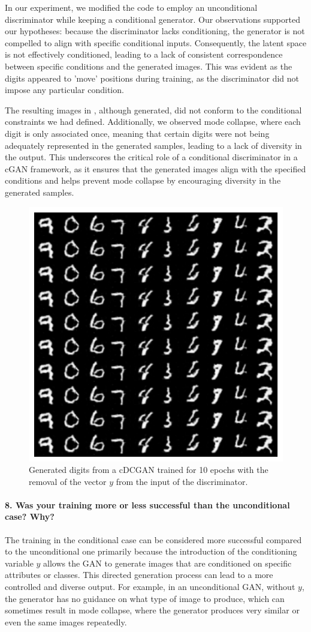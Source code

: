 In our experiment, we modified the code to employ an unconditional discriminator while keeping a conditional generator. Our observations supported our hypotheses: because the discriminator lacks conditioning, the generator is not compelled to align with specific conditional inputs. Consequently, the latent space is not effectively conditioned, leading to a lack of consistent correspondence between specific conditions and the generated images. This was evident as the digits appeared to 'move' positions during training, as the discriminator did not impose any particular condition.

The resulting images in , although generated, did not conform to the conditional constraints we had defined.  Additionally, we observed mode collapse, where each digit is only associated once, meaning that certain digits were not being adequately represented in the generated samples, leading to a lack of diversity in the output. This underscores the critical role of a conditional discriminator in a cGAN framework, as it ensures that the generated images align with the specified conditions and helps prevent mode collapse by encouraging diversity in the generated samples.

\begin{figure}[H]
    \centering
    \includegraphics[width=.5\textwidth]{cgan_mnist}
    \caption{Generated digits from a cDCGAN trained for 10 epochs with the removal of the vector $y$ from the input of the discriminator.}
    \label{fig:cgan_mnist}
\end{figure}

\paragraph*{8. Was your training more or less successful than the unconditional case? Why?}

The training in the conditional case can be considered more successful compared to the unconditional one primarily because the introduction of the conditioning variable $ y $ allows the GAN to generate images that are conditioned on specific attributes or classes. This directed generation process can lead to a more controlled and diverse output. For example, in an unconditional GAN, without $ y $, the generator has no guidance on what type of image to produce, which can sometimes result in mode collapse, where the generator produces very similar or even the same images repeatedly.

